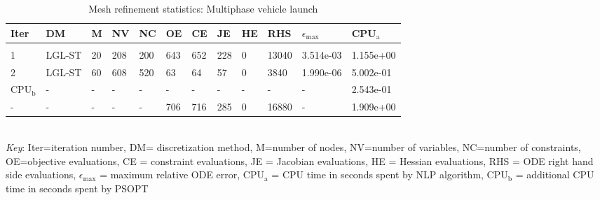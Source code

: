 
\begin{table}
\caption{Mesh refinement statistics: Multiphase vehicle launch}
\label{mesh_stats_launch}
\renewcommand{\tabcolsep}{0.15cm}
\tiny
\begin{tabular}{llllllllllll}
Iter&DM&M&NV&NC&OE&CE&JE&HE&RHS&$\epsilon_{\max}$&CPU$_\mathrm{a}$ \\ \hline \\
1&LGL-ST&20&208&200&643&652&228&0&13040&3.514e-03&1.155e+00\\
2&LGL-ST&60&608&520&63&64&57&0&3840&1.990e-06&5.002e-01\\
\hline
CPU$_\mathrm{b}$ &-&-&-&-&-&-&-&-&-&-&2.543e-01\\
-&-&-&-&-&706&716&285&0&16880&-&1.909e+00\\
\end{tabular}
\newline \\ \emph{Key}: Iter=iteration number, DM= discretization method, M=number of nodes, NV=number of variables, NC=number of constraints, OE=objective evaluations,  	              CE = constraint evaluations, JE = Jacobian evaluations, HE = Hessian evaluations, RHS = ODE right hand side 		      evaluations, $\epsilon_{\max}$ = maximum relative ODE error, CPU$_\mathrm{a}$ = CPU time in seconds spent by NLP algorithm, 		      CPU$_\mathrm{b}$ = additional CPU time in seconds spent by PSOPT
\normalsize
\end{table}